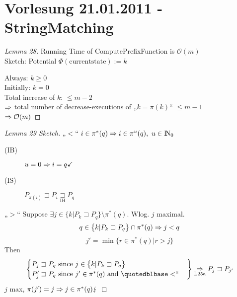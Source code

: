 \documentclass[12pt,oneside,a4paper,parskip=on,fleqn]{scrartcl}
\begin{document}
\section*{Vorlesung 21.01.2011 - StringMatching}
\begin{proof}[Lemma 28] Running Time of ComputePrefixFunction is $\mathcal{O}(m)$\\
	Sketch: Potential $\Phi(\mathrm{currentstate}):=k$
	\begin{figure}[ht]
	\centering
	\end{figure}
	Always: $k\geq 0$ \\
	Initially: $k=0$\\
	Total increase of $k$: $\leq m-2$\\
	$\Rightarrow$ total number of decrease-executions of „$k=\pi(k)$“ $\leq m-1$\\
	$\Rightarrow \mathcal{O}(m)$
\end{proof}

\begin{proof}[Lemma 29 Sketch] 
	„$<$“ $i\in \pi^*(q) \Ra i\in \pi^u(q),\ u\in \N_0$\\
	\begin{description}
		\item[(IB)] $u=0 \Rightarrow i=q \checkmark$
		\item[(IS)] $P_{\pi(i)} \sqsupset P_i \underset{\text{IH}}{\sqsupset} P_q$
	\end{description}

	„$>$“ Suppose $\exists j \in \bigl\{ k | P_k \sqsupset P_q \bigr\}\setminus \pi^*(q).$ Wlog. $j$ maximal.
	\[
		q \in \bigl\{ k| P_k \sqsupset P_q \bigr\} \cap \pi^*(q) \Rightarrow j<q
	\]\[
		j' = \min\bigl\{ r\in \pi^*(q) | r>j \bigr\}
	\]
	Then \[
	\left.\begin{cases}
		P_j \sqsupset P_q \text{ since } j\in \bigl\{ k|P_k \sqsupset P_q \bigr\}\\
		P_j' \sqsupset P_q \text{ since } j'\in \pi^*(q) \text{ and } \mathrm{„<}\text{“}
	\end{cases}\right\} \underset{\text{L25a}}{\Ra} P_j \sqsupset P_{j'}
	\]
	$j$ max, $\pi(j') = j \Rightarrow j\in\pi^*(q) \lightning$
\end{proof}
\end{document}
